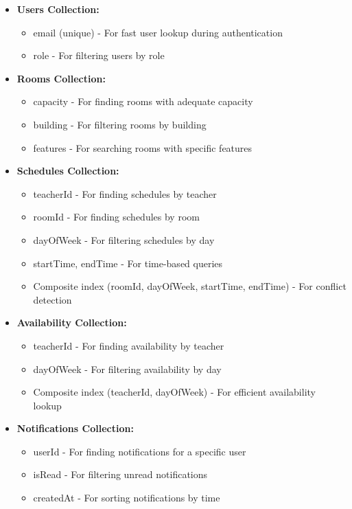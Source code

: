 \documentclass[12pt,a4paper]{report}
\begin{document}
\begin{itemize}
    \item \textbf{Users Collection:}
    \begin{itemize}
        \item email (unique) - For fast user lookup during authentication
        \item role - For filtering users by role
    \end{itemize}
    
    \item \textbf{Rooms Collection:}
    \begin{itemize}
        \item capacity - For finding rooms with adequate capacity
        \item building - For filtering rooms by building
        \item features - For searching rooms with specific features
    \end{itemize}
    
    \item \textbf{Schedules Collection:}
    \begin{itemize}
        \item teacherId - For finding schedules by teacher
        \item roomId - For finding schedules by room
        \item dayOfWeek - For filtering schedules by day
        \item startTime, endTime - For time-based queries
        \item Composite index (roomId, dayOfWeek, startTime, endTime) - For conflict detection
    \end{itemize}
    
    \item \textbf{Availability Collection:}
    \begin{itemize}
        \item teacherId - For finding availability by teacher
        \item dayOfWeek - For filtering availability by day
        \item Composite index (teacherId, dayOfWeek) - For efficient availability lookup
    \end{itemize}
    
    \item \textbf{Notifications Collection:}
    \begin{itemize}
        \item userId - For finding notifications for a specific user
        \item isRead - For filtering unread notifications
        \item createdAt - For sorting notifications by time
    \end{itemize}
\end{itemize}
\end{document}
